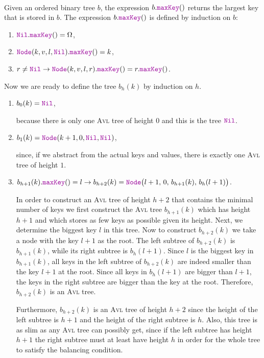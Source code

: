 \\[0.2cm]
Given an ordered binary tree  $b$, the expression $b.\mytt{maxKey}()$ returns the largest
key that is stored in $b$.  The expression  $b.\mytt{maxKey}()$ is defined by induction on $b$:
\begin{enumerate}
\item $\mytt{Nil}.\mytt{maxKey}() = \Omega$,
\item $\mytt{Node}(k,v,l,\mytt{Nil}).\mytt{maxKey}() = k$,
\item $r \not= \mytt{Nil} \rightarrow \mytt{Node}(k,v,l,r).\mytt{maxKey}() = r.\mytt{maxKey}()$.
\end{enumerate}
Now we are ready to define the tree $b_h(k)$ by induction on  $h$.
\begin{enumerate}
\item $b_0(k) = \mytt{Nil}$,

      because there is only one \textsc{Avl} tree of height $0$ and this is the tree $\mytt{Nil}$.
\item $b_1(k) = \mytt{Node}(k+1,0,\mytt{Nil}, \mytt{Nil})$,

      since, if we abstract from the actual keys and values, there is exactly one \textsc{Avl} tree of height
      $1$.
\item $b_{h+1}(k).\mytt{maxKey}() = l \rightarrow 
       b_{h+2}(k) = \mytt{Node}\bigl(l+1,\,0,\,b_{h+1}(k),\,b_h(l+1)\bigr)$.

      In order to construct an \textsc{Avl} tree of height $h+2$ that contains the minimal number of keys 
      we first construct the \textsc{Avl} tree $b_{h+1}(k)$ which has height  $h+1$ and which stores as few
      keys as possible given its height.  Next, we determine the biggest key $l$ in this tree. 
      Now to construct $b_{h+2}(k)$ we take a node with the key $l+1$ as the root.
      The left subtree of $b_{h+2}(k)$ is $b_{h+1}(k)$, while its right subtree is $b_h(l+1)$.
      Since $l$ is the biggest key in $b_{h+1}(k)$, all keys in the left subtree of
      $b_{h+2}(k)$ are indeed smaller than the key $l+1$ at the root.  Since all keys in
      $b_h(l+1)$ are bigger than $l+1$, the keys in the right subtree are bigger than the key at the
      root.  Therefore, $b_{h+2}(k)$ is an \textsc{Avl} tree.

      Furthermore, $b_{h+2}(k)$ is an \textsc{Avl} tree of height $h+2$ since the height of the left subtree
      is $h+1$ and the height of the right subtree is $h$.  Also, this tree is as slim as
      any \textsc{Avl} tree can possibly get, since if the left subtree has height $h+1$ the right subtree
      must at least have height $h$ in order for the whole tree to satisfy the balancing condition.
\end{enumerate}
